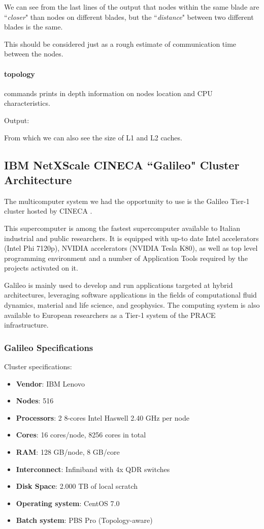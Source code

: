 \documentclass[a4paper,12pt]{article}
\begin{document}
We can see from the last lines of the output that nodes within the same blade are ``\textit{closer}" than nodes on different blades, but the ``\textit{distance}" between two different blades is the same.

This should be considered just as a rough estimate of communication time between the nodes.

\paragraph{topology} commands prints in depth information on nodes location and CPU characteristics.

Output:

From which we can also see the size of L1 and L2 caches.


\subsection{IBM NetXScale CINECA ``Galileo" Cluster Architecture}\label{galileoarch:sec}

The multicomputer system we had the opportunity to use is the Galileo Tier-1 cluster hosted by CINECA \cite{Galileo}.

This supercomputer is among  the fastest supercomputer available to Italian industrial and public researchers. It is equipped with up-to date Intel accelerators (Intel Phi 7120p), NVIDIA accelerators (NVIDIA Tesla K80), as well as top level programming environment and a number of Application Tools required by the projects activated on it.

Galileo is mainly used to develop and run applications targeted at hybrid architectures, leveraging software applications in the fields of computational fluid dynamics, material and life science, and geophysics. The computing system is also available to European researchers as a Tier-1 system of the PRACE infrastructure.


\subsubsection{Galileo Specifications}

Cluster specifications: 
\begin{itemize}
\item \textbf{Vendor}: IBM Lenovo
\item \textbf{Nodes}: 516 
\item \textbf{Processors}: 2 8-cores Intel Haswell 2.40 GHz per node
\item \textbf{Cores}: 16 cores/node, 8256 cores in total
\item \textbf{RAM}: 128 GB/node, 8 GB/core
\item \textbf{Interconnect}: Infiniband with 4x QDR switches
\item \textbf{Disk Space}: 2.000 TB of local scratch
\item \textbf{Operating system}: CentOS 7.0
\item \textbf{Batch system}: PBS Pro (Topology-aware)
\end{itemize}
\end{document}
